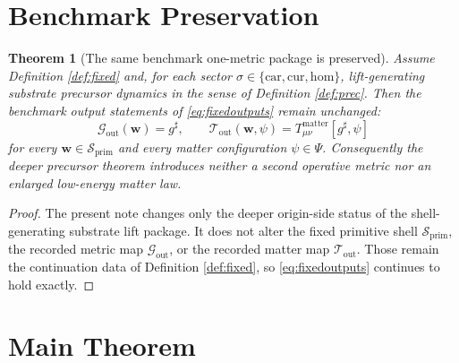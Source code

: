 \documentclass[11pt]{article}
\newcommand{\CompletedMetric}{g^{\sharp}}
\newcommand{\Car}{\mathrm{car}}
\newcommand{\Cur}{\mathrm{cur}}
\newcommand{\Hom}{\mathrm{hom}}
\newcommand{\PrimShell}{\mathcal S_{\mathrm{prim}}}
\newcommand{\MetricOut}{\mathscr G_{\mathrm{out}}}
\newcommand{\MatterOut}{\mathscr T_{\mathrm{out}}}
\newtheorem{theorem}{Theorem}
\begin{document}
\section{Benchmark Preservation}

\begin{theorem}[The same benchmark one-metric package is preserved]
\label{thm:outputs}
Assume Definition \ref{def:fixed} and, for each sector \(\sigma\in\{\Car,\Cur,\Hom\}\), lift-generating substrate precursor dynamics in the sense of Definition \ref{def:prec}. Then the benchmark output statements of \eqref{eq:fixedoutputs} remain unchanged:
\[
\MetricOut(\mathbf w)=\CompletedMetric,
\qquad
\MatterOut(\mathbf w,\psi)
=
T_{\mu\nu}^{\mathrm{matter}}[\CompletedMetric,\psi]
\]
for every \(\mathbf w\in\PrimShell\) and every matter configuration \(\psi\in\Psi\). Consequently the deeper precursor theorem introduces neither a second operative metric nor an enlarged low-energy matter law.
\end{theorem}

\begin{proof}
The present note changes only the deeper origin-side status of the shell-generating substrate lift package. It does not alter the fixed primitive shell \(\PrimShell\), the recorded metric map \(\MetricOut\), or the recorded matter map \(\MatterOut\). Those remain the continuation data of Definition \ref{def:fixed}, so \eqref{eq:fixedoutputs} continues to hold exactly.
\end{proof}

\section{Main Theorem}
\end{document}
